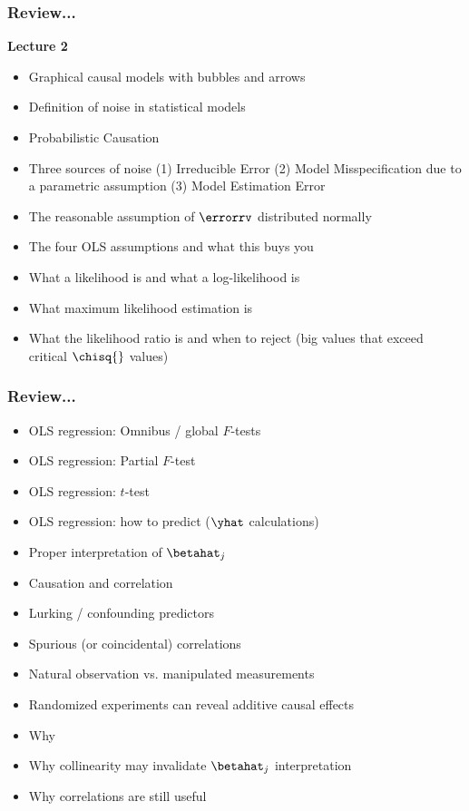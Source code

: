 \documentclass[handout]{beamer}
\begin{document}
\begin{frame}\frametitle{Review...}

\textbf{Lecture 2}

\begin{itemize}
\item Graphical causal models with bubbles and arrows
\item Definition of noise in statistical models
\item Probabilistic Causation
\item Three sources of noise (1) Irreducible Error (2) Model Misspecification due to a parametric assumption (3) Model Estimation Error
\item The reasonable assumption of $\errorrv$ distributed normally
\item The four OLS assumptions and what this buys you
\item What a likelihood is and what a log-likelihood is
\item What maximum likelihood estimation is
\item What the likelihood ratio is and when to reject (big values that exceed critical $\chisq{}$ values)
\end{itemize}
	
\end{frame}

\begin{frame}\frametitle{Review...}

\begin{itemize}
\item OLS regression: Omnibus / global $F$-tests
\item OLS regression: Partial $F$-test
\item OLS regression: $t$-test
\item OLS regression: how to predict ($\yhat$ calculations)
\item Proper interpretation of $\betahat_j$
\item Causation and correlation
\item Lurking / confounding predictors
\item Spurious (or coincidental) correlations
\item Natural observation vs. manipulated measurements
\item Randomized experiments can reveal additive causal effects
\item Why 
\item Why collinearity may invalidate $\betahat_j$ interpretation
\item Why correlations are still useful
\end{itemize}
	
\end{frame}
\end{document}
